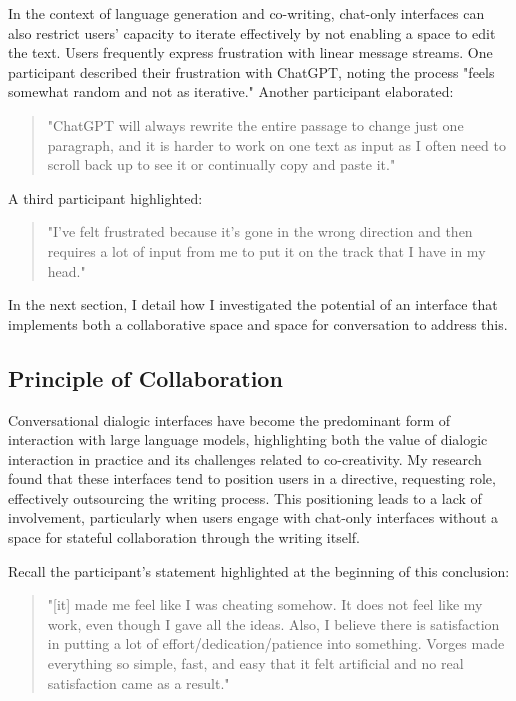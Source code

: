 In the context of language generation and co-writing, chat-only interfaces can also restrict users' capacity to iterate effectively by not enabling a space to edit the text. Users frequently express frustration with linear message streams. One participant described their frustration with ChatGPT, noting the process "feels somewhat random and not as iterative." Another participant elaborated:

\begin{quote}
"ChatGPT will always rewrite the entire passage to change just one paragraph, and it is harder to work on one text as input as I often need to scroll back up to see it or continually copy and paste it."
\end{quote}

A third participant highlighted:

\begin{quote}
"I've felt frustrated because it's gone in the wrong direction and then requires a lot of input from me to put it on the track that I have in my head."
\end{quote}


In the next section, I detail how I investigated the potential of an interface that implements both a collaborative space and space for conversation to address this. 

\subsection{Principle of Collaboration}

Conversational dialogic interfaces have become the predominant form of interaction with large language models, highlighting both the value of dialogic interaction in practice and its challenges related to co-creativity. My research found that these interfaces tend to position users in a directive, requesting role, effectively outsourcing the writing process. This positioning leads to a lack of involvement, particularly when users engage with chat-only interfaces without a space for stateful collaboration through the writing itself.

Recall the participant's statement highlighted at the beginning of this conclusion:

\begin{quote}
"[it] made me feel like I was cheating somehow. It does not feel like my work, even though I gave all the ideas. Also, I believe there is satisfaction in putting a lot of effort/dedication/patience into something. Vorges made everything so simple, fast, and easy that it felt artificial and no real satisfaction came as a result."
\end{quote}

